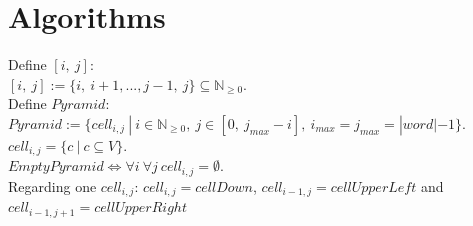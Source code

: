 
\section{Algorithms}\label{algorithms}
\noindent Define $[i,\ j]$: \\
$[i,\ j] := \{i,\ i+1,..., j-1,\ j\} \subseteq \mathbb{N}_{\geq 0}$.\\

\noindent Define $Pyramid$:\\
$Pyramid :=\{ cell_{i,j}\ |\ i \in \mathbb{N}_{\geq 0},\  j \in [0,\ j_{max}-i],\ i_{max} = j_{max} = |word|-1\}$.\\
$cell_{i,j} = \{c\ |\ c \subseteq V\}$.\\
$EmptyPyramid \Leftrightarrow \forall i\ \forall j\ cell_{i,j}=\emptyset$.\\
Regarding one $cell_{i,j}$: $cell_{i,j} = cellDown$, $cell_{i-1,j} = cellUpperLeft$ and $cell_{i-1,j+1} = cellUpperRight$  \\


